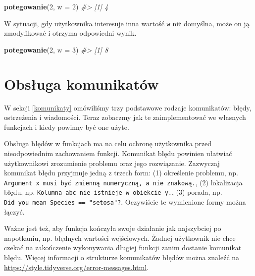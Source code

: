\documentclass[paper=6in:9in,pagesize=pdftex,headinclude=on,footinclude=on,10pt]{scrbook}
\newenvironment{Shaded}{\begin{snugshade}}{\end{snugshade}}
\newcommand{\CommentTok}[1]{\textcolor[rgb]{0.56,0.35,0.01}{\textit{#1}}}
\newcommand{\DataTypeTok}[1]{\textcolor[rgb]{0.13,0.29,0.53}{#1}}
\newcommand{\DecValTok}[1]{\textcolor[rgb]{0.00,0.00,0.81}{#1}}
\newcommand{\KeywordTok}[1]{\textcolor[rgb]{0.13,0.29,0.53}{\textbf{#1}}}
\newcommand{\NormalTok}[1]{#1}
\begin{document}
\begin{Shaded}
\begin{Highlighting}[]
\KeywordTok{potegowanie}\NormalTok{(}\DecValTok{2}\NormalTok{, }\DataTypeTok{w =} \DecValTok{2}\NormalTok{)}
\CommentTok{#> [1] 4}
\end{Highlighting}
\end{Shaded}

W sytuacji, gdy użytkownika interesuje inna wartość \texttt{w} niż domyślna, może on ją zmodyfikować i otrzyma odpowiedni wynik.

\begin{Shaded}
\begin{Highlighting}[]
\KeywordTok{potegowanie}\NormalTok{(}\DecValTok{2}\NormalTok{, }\DataTypeTok{w =} \DecValTok{3}\NormalTok{)}
\CommentTok{#> [1] 8}
\end{Highlighting}
\end{Shaded}

\hypertarget{obsluga-komunikatow}{%
\section{Obsługa komunikatów}\label{obsluga-komunikatow}}

W sekcji \ref{komunikaty} omówiliśmy trzy podstawowe rodzaje komunikatów: błędy, ostrzeżenia i wiadomości.
Teraz zobaczmy jak te zaimplementować we własnych funkcjach i kiedy powinny być one użyte.

Obsługa błędów w funkcjach ma na celu ochronę użytkownika przed nieodpowiednim zachowaniem funkcji.
Komunikat błędu powinien ułatwiać użytkownikowi zrozumienie problemu oraz jego rozwiązanie.
Zazwyczaj komunikat błędu przyjmuje jedną z trzech form: (1) określenie problemu, np. \texttt{Argument\ \textquotesingle{}x\textquotesingle{}\ musi\ być\ zmienną\ numeryczną,\ a\ nie\ znakową.}, (2) lokalizacja błędu, np. \texttt{Kolumna\ \textquotesingle{}abc\textquotesingle{}\ nie\ istnieje\ w\ obiekcie\ \textquotesingle{}y\textquotesingle{}.}, (3) porada, np. \texttt{Did\ you\ mean\ \textquotesingle{}Species\ ==\ "setosa"\textquotesingle{}?}.
Oczywiście te wymienione formy można łączyć.

Ważne jest też, aby funkcja kończyła swoje działanie jak najszybciej po napotkaniu, np. błędnych wartości wejściowych.
Żadnej użytkownik nie chce czekać na zakończenie wykonywania długiej funkcji zanim dostanie komunikat błędu.
Więcej informacji o strukturze komunikatów błędów można znaleźć na \url{https://style.tidyverse.org/error-messages.html}.
\end{document}
